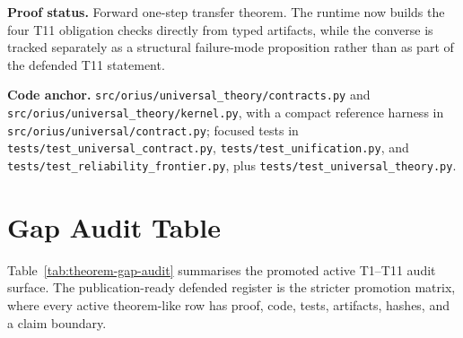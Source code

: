 \textbf{Proof status.} Forward one-step transfer theorem.  The runtime now
builds the four T11 obligation checks directly from typed artifacts, while the
converse is tracked separately as a structural failure-mode proposition rather
than as part of the defended T11 statement.

\textbf{Code anchor.} \texttt{src/orius/universal\_theory/contracts.py} and
\texttt{src/orius/universal\_theory/kernel.py}, with a compact reference
harness in \texttt{src/orius/universal/contract.py}; focused tests in
\texttt{tests/test\_universal\_contract.py},
\texttt{tests/test\_unification.py}, and
\texttt{tests/test\_reliability\_frontier.py}, plus
\texttt{tests/test\_universal\_theory.py}.

\section{Gap Audit Table}

Table~\ref{tab:theorem-gap-audit} summarises the promoted active T1--T11
audit surface.  The publication-ready defended register is the stricter
promotion matrix, where every active theorem-like row has proof, code, tests,
artifacts, hashes, and a claim boundary.

